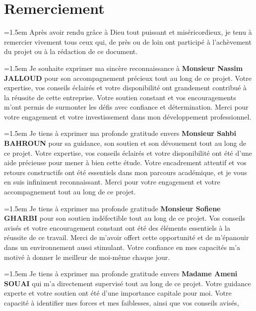 \chapter*{Remerciement}
\begin{center}
    

\par \parindent=1.5em Après avoir rendu grâce à Dieu tout puissant et miséricordieux, je tenu à remercier vivement tous ceux
qui, de près ou de loin ont participé à l’achèvement du projet ou à la rédaction de ce document. 
\vspace{0.5cm}
\par \parindent=1.5em Je souhaite exprimer ma sincère reconnaissance à \textbf{Monsieur Nassim JALLOUD} pour son accompagnement précieux 
tout au long de ce projet. Votre expertise, vos conseils éclairés et votre disponibilité ont grandement contribué à la réussite de 
cette entreprise. Votre soutien constant et vos encouragements m'ont permis de surmonter les défis avec confiance et détermination.
 Merci pour votre engagement et votre investissement dans mon développement professionnel.
\vspace{0.5cm}
\par \parindent=1.5em Je tiens à exprimer ma profonde gratitude envers \textbf{Monsieur Sahbi BAHROUN} pour sa guidance, son soutien et 
son dévouement tout au long de ce projet. Votre expertise, vos conseils éclairés et votre disponibilité ont été d'une aide 
précieuse pour mener à bien cette étude. Votre encadrement attentif et vos retours constructifs ont été essentiels dans mon 
parcours académique, et je vous en suis infiniment reconnaissant.
 Merci pour votre engagement et votre accompagnement tout au long de ce projet.
\vspace{0.5cm}
\par \parindent=1.5em Je tiens à exprimer ma profonde gratitude \textbf{Monsieur Sofiene GHARBI} pour son soutien indéfectible tout au long de ce projet.
 Vos conseils avisés et votre encouragement constant ont été des éléments essentiels à la réussite de ce travail. 
 Merci de m'avoir offert cette opportunité  et de m'épanouir dans un environnement aussi stimulant.
  Votre confiance en mes capacités m'a motivé à donner le meilleur de moi-même chaque jour.
\vspace{0.5cm}
\par \parindent=1.5em Je tiens à exprimer ma profonde gratitude envers \textbf{Madame Ameni SOUAI} qui m'a directement supervisé tout au long de ce projet. 
Votre guidance experte et votre soutien ont été d'une importance capitale pour moi. Votre capacité à identifier mes forces et mes faiblesses, ainsi que vos conseils avisés, 

\end{center}

